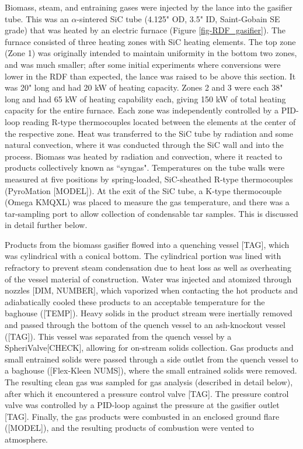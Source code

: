 \documentclass[11pt,twocolumn]{article}
\begin{document}
Biomass, steam, and entraining gases were injected by the lance into the gasifier tube.  This was an $\alpha$-sintered SiC tube (4.125" OD, 3.5" ID, Saint-Gobain SE grade) that was heated by an electric furnace (Figure \ref{fig-RDF_gasifier}).  The furnace consisted of three heating zones with SiC heating elements.  The top zone (Zone 1) was originally intended to maintain uniformity in the bottom two zones, and was much smaller; after some initial experiments where conversions were lower in the RDF than expected, the lance was raised to be above this section.  It was 20" long and had 20 kW of heating capacity.  Zones 2 and 3 were each 38" long and had 65 kW of heating capability each, giving 150 kW of total heating capacity for the entire furnace.  Each zone was independently controlled by a PID-loop reading R-type thermocouples located between the elements at the center of the respective zone.  Heat was transferred to the SiC tube by radiation and some natural convection, where it was conducted through the SiC wall and into the process.  Biomass was heated by radiation and convection, where it reacted to products collectively known as ``syngas".  Temperatures on the tube walls were measured at five positions by spring-loaded, SiC-sheathed R-type thermocouples (PyroMation [MODEL]).  At the exit of the SiC tube, a K-type thermocouple (Omega KMQXL) was placed to measure the gas temperature, and there was a tar-sampling port to allow collection of condensable tar samples.  This is discussed in detail further below.

Products from the biomass gasifier flowed into a quenching vessel [TAG], which was cylindrical with a conical bottom.  The cylindrical portion was lined with refractory to prevent steam condensation due to heat loss as well as overheating of the vessel material of construction.  Water was injected and atomized through nozzles [DIM, NUMBER], which vaporized when contacting the hot products and adiabatically cooled these products to an acceptable temperature for the baghouse ([TEMP]).  Heavy solids in the product stream were inertially removed and passed through the bottom of the quench vessel to an ash-knockout vessel ([TAG]).  This vessel was separated from the quench vessel by a SpheriValve[CHECK], allowing for on-stream solids collection.  Gas products and small entrained solids were passed through a side outlet from the quench vessel to a baghouse ([Flex-Kleen NUMS]), where the small entrained solids were removed.  The resulting clean gas was sampled for gas analysis (described in detail below), after which it encountered a pressure control valve [TAG].  The pressure control valve was controlled by a PID-loop against the pressure at the gasifier outlet [TAG].  Finally, the gas products were combusted in an enclosed ground flare ([MODEL]), and the resulting products of combustion were vented to atmosphere.
\end{document}
